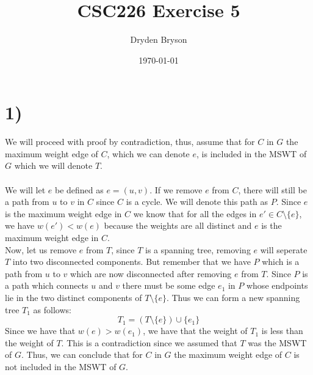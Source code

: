 \documentclass{article}
\title{CSC226 Exercise 5}
\author{Dryden Bryson}
\date{\today}
\begin{document}
\maketitle
\newpage
\section*{1)}
We will proceed with proof by contradiction, thus, assume that for $C$ in $G$ the maximum weight edge of $C$, which we can denote $e$, is included in the MSWT of $G$ which we will denote $T$.\\\\

We will let $e$ be defined as $e = (u, v)$. If we remove $e$ from $C$, there will still be a path from $u$ to $v$ in $C$ since $C$ is a cycle. We will denote this path as $P$. Since $e$ is the maximum weight edge in $C$ we know that for all the edges in $e' \in C \setminus \{e\}$, we have $w(e') < w(e)$ because the weights are all distinct and $e$ is the maximum weight edge in $C$.\\

Now, let us remove $e$ from $T$, since $T$ is a spanning tree, removing $e$ will seperate $T$ into two disconnected components. But remember that we have $P$ which is a path from $u$ to $v$ which are now disconnected after removing $e$ from $T$. Since $P$ is a path which connects $u$ and $v$ there must be some edge $e_{1}$ in $P$ whose endpoints lie in the two distinct components of $T \setminus \{e\}$. Thus we can form a new spanning tree $T_{1}$ as follows:
$$T_{1}=(T \setminus \{e\}) \cup \{e_{1}\}$$
Since we have that $w(e) > w(e_{1})$, we have that the weight of $T_{1}$ is less than the weight of $T$. This is a contradiction since we assumed that $T$ was the MSWT of $G$. Thus, we can conclude that for $C$ in $G$ the maximum weight edge of $C$ is not included in the MSWT of $G$.
\end{document}

